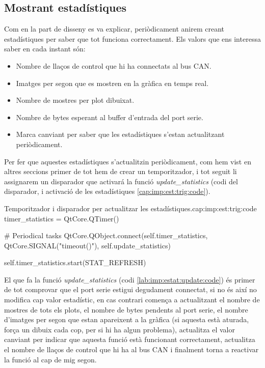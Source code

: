 \FloatBarrier

\subsection{Mostrant estadístiques}\label{cap:imp:estat}

Com en la part de disseny es va explicar, periòdicament anirem creant estadístiques per saber que tot funciona correctament. 
Els valors que ens interessa saber en cada instant són: 

\begin{itemize}
	\item Nombre de llaços de control que hi ha connectats al bus CAN.
	\item Imatges per segon que es mostren en la gràfica en temps real.
	\item Nombre de mostres per plot dibuixat.
	\item Nombre de bytes esperant al buffer d'entrada del port serie.
	\item Marca canviant per saber que les estadístiques s'estan actualitzant periòdicament.
\end{itemize}

Per fer que aquestes estadístiques s'actualitzin periòdicament, com hem vist en altres seccions primer de tot hem de crear un temporitzador, i tot seguit li assignarem un disparador que activará la funció \emph{update\_statistics} (codi del disparador, i activació de les estadístiques \ref{cap:imp:est:trig:code}).

\begin{code_python}{Temporitzador i disparador per actualitzar les estadístiques.}{cap:imp:est:trig:code}
timer_statistics = QtCore.QTimer()

# Periodical tasks
QtCore.QObject.connect(self.timer_statistics, QtCore.SIGNAL("timeout()"), self.update_statistics)

self.timer_statistics.start(STAT_REFRESH)
\end{code_python}

El que fa la funció \emph{update\_statistics} (codi \ref{lab:imp:estat:update:code}) és primer de tot comprovar que el port serie estigui degudament connectat, si no és així no modifica cap valor estadístic, en cas contrari comença a actualitzant el nombre de mostres de tots els plots, el nombre de bytes pendents al port serie, el nombre d'imatges per segon que estan apareixent a la gràfica (si aquesta està aturada, força un dibuix cada cop, per si hi ha algun problema), actualitza el valor canviant per indicar que aquesta funció està funcionant correctament, actualitza el nombre de llaços de control que hi ha al bus CAN i finalment torna a reactivar la funció al cap de mig segon.

